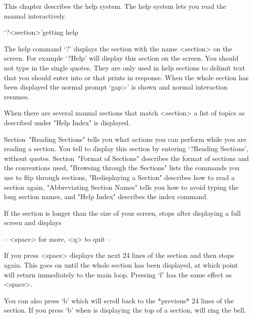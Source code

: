 %
%
%
%

This chapter describes the {\GAP} help system.
The help system lets you read the manual interactively.


\>`?<section>'{getting help}

The help command `?' displays the section with the name <section> on the
screen. For example `?Help' will display this section on the screen.
You should not type in the single quotes. They are only used in help
sections to delimit text that you should enter into {\GAP} or that {\GAP}
prints in response. When the whole section has been displayed the normal
{\GAP} prompt `gap>' is shown and normal {\GAP} interaction resumes.

When there are several manual sections that match <section> a list of topics
as described under "Help Index" is displayed.

Section~"Reading Sections" tells you what actions you can perform
while you are reading a section. You tell {\GAP} to display this
section by entering `?Reading Sections', without quotes.
Section~"Format of Sections" describes the format of sections and the
conventions used,
"Browsing through the Sections" lists the commands you use to flip
through sections, "Redisplaying a Section" describes how to read a
section again, "Abbreviating Section Names" tells you how to avoid typing
the long section names, and "Help Index" describes the index command.


If the section is longer than the size of your screen, {\GAP} stops after
displaying a full screen and displays

\begintt
-- <space> for more, <q> to quit --
\endtt

If you press <space> {\GAP} displays the next 24 lines of the section and
then stops again. This goes on until the whole section has been
displayed, at which point {\GAP} will return immediately to the main
{\GAP} loop. Pressing `f' has the same effect as <space>.

You can also press `b' which will scroll back to
the *previous* 24 lines of the section. If you press `b' when
{\GAP} is displaying the top of a section, {\GAP} will ring the bell.

